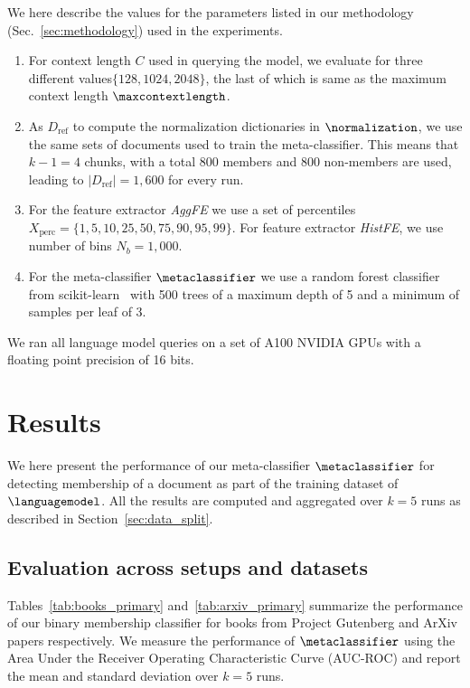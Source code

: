 \documentclass[twocolumn,10pt]{article}
\begin{document}
We here describe the values for the parameters listed in our methodology (Sec.~\ref{sec:methodology}) used in the experiments. 

\begin{enumerate}
    \item For context length $C$ used in querying the model, we evaluate for three different values$\{128, 1024,2048\}$, the last of which is same as the maximum context length $\maxcontextlength$.
    \item As $D_\text{ref}$ to compute the normalization dictionaries in $\normalization$, we use the same sets of documents used to train the meta-classifier. This means that $k-1 = 4$ chunks, with a total $800$ members and $800$ non-members are used, leading to $|D_\text{ref}| = 1,600$ for every run. 
    \item For the feature extractor \textit{AggFE} we use a set of percentiles $X_\text{perc} = \{1, 5, 10, 25, 50, 75, 90, 95, 99\}$. For feature extractor \textit{HistFE}, we use number of bins $N_b = 1,000$.
    \item For the meta-classifier $\metaclassifier$ we use a random forest classifier from scikit-learn~\cite{scikit-learn} with 500 trees of a maximum depth of 5 and a minimum of samples per leaf of 3. 
\end{enumerate}

We ran all language model queries on a set of A100 NVIDIA GPUs with a floating point precision of 16 bits.
 


\section{Results}
We here present the performance of our meta-classifier $\metaclassifier$ for detecting membership of a document as part of the training dataset of $\languagemodel$. All the results are computed and aggregated over $k=5$ runs as described in Section~\ref{sec:data_split}.

\subsection{Evaluation across setups and datasets}
\label{sec:results_primary}

Tables~\ref{tab:books_primary} and~\ref{tab:arxiv_primary} summarize the performance of our binary membership classifier for books from Project Gutenberg and ArXiv papers respectively. We measure the performance of $\metaclassifier$ using the Area Under the Receiver Operating Characteristic Curve (AUC-ROC) and report the mean and standard deviation over $k=5$ runs. 
\end{document}
